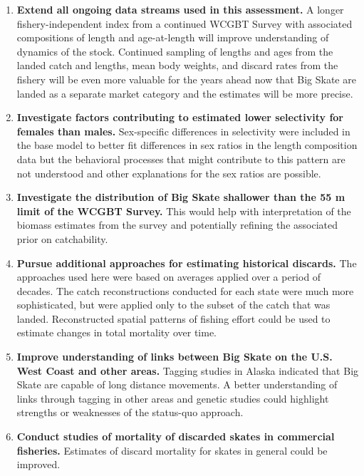 \documentclass[12pt,]{article}
\begin{document}
\begin{enumerate}

\item \textbf{Extend all ongoing data streams used in this assessment.} A longer fishery-independent index from a continued WCGBT Survey with associated compositions of length and age-at-length will improve understanding of dynamics of the stock. Continued sampling of lengths and ages from the landed catch and lengths, mean body weights, and discard rates from the fishery will be even more valuable for the years ahead now that Big Skate are landed as a separate market category and the estimates will be more precise.

\item \textbf{Investigate factors contributing to estimated lower selectivity for females than males.} Sex-specific differences in selectivity were included in the base model to better fit differences in sex ratios in the length composition data but the behavioral processes that might contribute to this pattern are not understood and other explanations for the sex ratios are possible.

\item \textbf{Investigate the distribution of Big Skate shallower than the 55 m limit of the WCGBT Survey.} This would help with interpretation of the biomass estimates from the survey and potentially refining the associated prior on catchability.

\item \textbf{Pursue additional approaches for estimating historical discards.} The approaches used here were based on averages applied over a period of decades. The catch reconstructions conducted for each state were much more sophisticated, but were applied only to the subset of the catch that was landed. Reconstructed spatial patterns of fishing effort could be used to estimate changes in total mortality over time.

\item \textbf{Improve understanding of links between Big Skate on the U.S. West Coast and other areas.} Tagging studies in Alaska indicated that Big Skate are capable of long distance movements. A better understanding of links through tagging in other areas and genetic studies could highlight strengths or weaknesses of the status-quo approach.

\item \textbf{Conduct studies of mortality of discarded skates in commercial fisheries.} Estimates of discard mortality for skates in general could be improved.


\end{enumerate}
\end{document}
